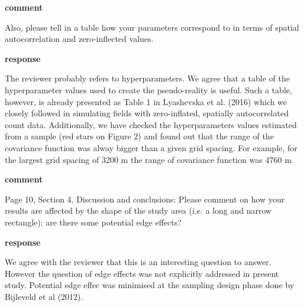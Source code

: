 \documentclass{letter}
\begin{document}
\begin{letter}
\textbf{comment} 

Also, please tell in a table how your parameters correspond to in terms of spatial autocorrelation and zero-inflected values. 

\textbf{response}

The reviewer probably refers to hyperparameters.  We agree that a table of the hyperparameter values used to create the pseudo-reality is useful. Such a table, however, is already presented as Table 1 in Lyashevska et al. (2016) which we closely followed in simulating fields with zero-inflated, spatially autocorrelated count data. Additionally, we have checked the hyperparameters values estimated from a sample (red stars on Figure 2) and found out that the range of the covariance function was alway bigger than a given grid spacing. For example, for the largest grid spacing of 3200 m the range of covariance function was 4760 m. 

\textbf{comment} 

Page 10, Section 4. Discussion and conclusions: Please comment on how your results are affected by the shape of the study area (i.e. a long and narrow rectangle): are there some potential edge effects?

\textbf{response}

We agree with the reviewer that this is an interesting question to answer. However the question of edge effects was not explicitly addressed in present study.  Potential edge effec was minimised at the sampling design phase done by Bijleveld et al (2012).

\end{letter}
\end{document}
